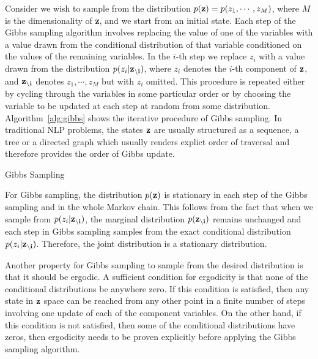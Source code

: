 Consider we wish to sample from the distribution $p({\bf z})=p(z_1,\cdots ,z_M)$, where $M$ is the dimensionality of {\bf z}, and we start from an initial state. Each step of the Gibbs sampling algorithm involves replacing the value of one of the variables 
with a value drawn from the conditional distribution of that variable conditioned on the values of the remaining variables. In the $i$-th step we replace $z_i$ with a value drawn from the distribution $p(z_i|{\bf z_{\setminus i}})$, where $z_i$ denotes the $i$-th component of ${\bf z}$, 
and ${\bf z_{\setminus i}}$ denotes $z_1,\cdots,z_M$ but with $z_i$ omitted. This procedure is repeated either by cycling through the variables
in some particular order or by choosing the variable to be updated at each step at random from some distribution. Algorithm~\ref{alg:gibbs} shows the iterative procedure of Gibbs sampling. In traditional NLP problems, the
states ${\bf z}$ are usually structured as a sequence, a tree or a directed graph which usually renders explict order
of traversal and therefore provides the order of Gibbs update.
\begin{algorithm}[t]
\small
\caption{Gibbs Sampling}
\begin{algorithmic}[1]
\STATE{$\vdots$}
\STATE{$\vdots$}
\ENDFOR
\end{algorithmic}
\label{alg:gibbs}
\end{algorithm}
For Gibbs sampling, the distribution $p({\bf z})$ is stationary in each step of the Gibbs sampling and in the whole Markov chain. This follows from the fact that when we sample from $p(z_i|{\bf z_{\setminus i}})$, the marginal distribution $p({\bf z_{\setminus i}})$ remains unchanged and each step in Gibbs sampling samples from the exact conditional distribution $p(z_i|{\bf z_{\setminus i}})$. Therefore, the joint distribution is a stationary distribution.


Another property for Gibbs sampling to sample from the desired distribution is that it should be ergodic. A sufficient condition for ergodicity is that none of the conditional distributions be anywhere zero. If this condition is satisfied, then any state in ${\bf z}$ space can be reached from any other point in a finite number of steps involving one update of each of the component variables. 
On the other hand, if this condition is not satisfied, then some of the conditional
distributions have zeros, then ergodicity needs to be proven explicitly before applying the Gibbs sampling algorithm.


